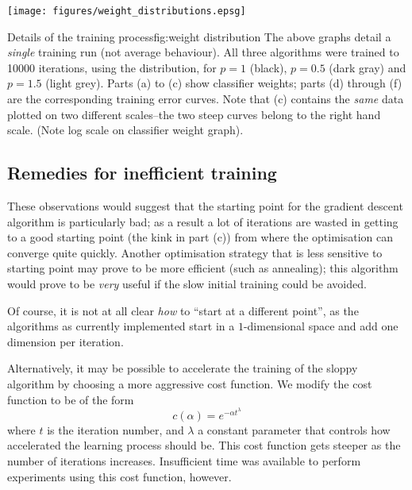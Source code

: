 \begin{linefigure}
\begin{center}
\hspace*{-1cm}\texttt{[image: figures/weight\_distributions.epsg]}
\end{center}
\begin{capt}{Details of the training process}{fig:weight distribution}
The above graphs detail a \emph{single} training run (not average
behaviour).  All three algorithms were trained to 10000 iterations,
using the  distribution, for $p=1$ (black), $p=0.5$
(dark gray) and $p=1.5$ (light grey).  Parts (a) to (c) show
classifier weights; parts (d) through (f) are the corresponding
training error curves.  Note that (c) contains the \emph{same} data
plotted on two different scales--the two steep curves belong to the
right hand scale.  (Note log scale on classifier weight graph).
\end{capt}
\end{linefigure}

\subsection{Remedies for inefficient training}

These observations would suggest that the starting point for the
gradient descent algorithm is particularly bad; as a result a lot of
iterations are wasted in getting to a good starting point (the kink in
part (c)) from where the optimisation can converge quite quickly.
Another optimisation strategy that is less sensitive to starting point
may prove to be more efficient (such as annealing); this algorithm
would prove to be \emph{very} useful if the slow initial training
could be avoided.

Of course, it is not at all clear \emph{how} to ``start at a different
point'', as the algorithms as currently implemented start in a
$1$-dimensional space and add one dimension per iteration.

Alternatively, it may be possible to accelerate the training of the
sloppy algorithm by choosing a more aggressive cost function.  We
modify the cost function to be of the form
%
\begin{equation}
c(\alpha) = e^{-\alpha t^\lambda}
\end{equation}
%
where $t$ is the iteration number, and $\lambda$ a constant parameter
that controls how accelerated the learning process should be.  This
cost function gets steeper as the number of iterations increases.
Insufficient time was available to perform experiments using this cost
function, however.

